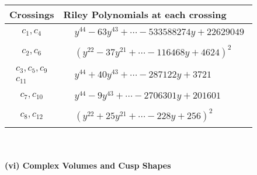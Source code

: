 \documentclass[1p]{elsarticle_modified}
\theoremstyle{definition}
\begin{document}
\begin{tabular}{m{50pt}|m{274pt}}
Crossings & \hspace{64pt}Riley Polynomials at each crossing \\
\hline $$\begin{aligned}c_{1},c_{4}\end{aligned}$$&$\begin{aligned}
&y^{44}-63 y^{43}+\cdots-533588274 y+22629049
\end{aligned}$\\
\hline $$\begin{aligned}c_{2},c_{6}\end{aligned}$$&$\begin{aligned}
&(y^{22}-37 y^{21}+\cdots-116468 y+4624)^{2}
\end{aligned}$\\
\hline $$\begin{aligned}c_{3},c_{5},c_{9}\\c_{11}\end{aligned}$$&$\begin{aligned}
&y^{44}+40 y^{43}+\cdots-287122 y+3721
\end{aligned}$\\
\hline $$\begin{aligned}c_{7},c_{10}\end{aligned}$$&$\begin{aligned}
&y^{44}-9 y^{43}+\cdots-2706301 y+201601
\end{aligned}$\\
\hline $$\begin{aligned}c_{8},c_{12}\end{aligned}$$&$\begin{aligned}
&(y^{22}+25 y^{21}+\cdots-228 y+256)^{2}
\end{aligned}$\\
\hline
\end{tabular}\\~\\
\newpage\flushleft \textbf{(vi) Complex Volumes and Cusp Shapes}
\end{document}
